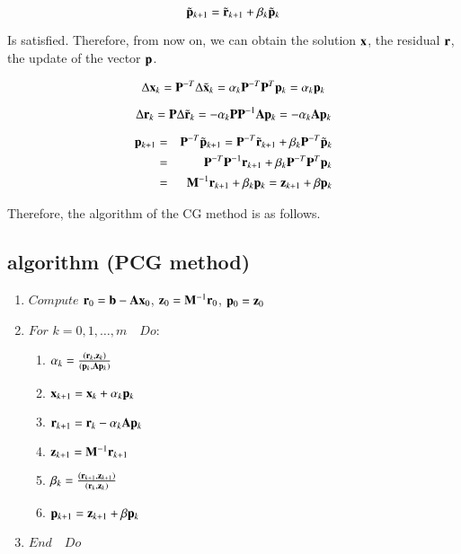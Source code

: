 \begin{equation}
\tilde{\mathbf{p}}_{k+1}=\tilde{\mathbf{r}}_{k+1}+\beta_k\tilde{\mathbf{p}}_k
\end{equation}

Is satisfied. Therefore, from now on, we can obtain the solution $\mathbf{x}$, the residual $\mathbf{r}$, the update of the vector $\mathbf{p}$.

\begin{equation}
\Delta\mathbf{x}_k=\mathbf{P}^{-T}\Delta\tilde{\mathbf{x}}_k=\alpha_k\mathbf{P}^{-T}\mathbf{P}^T\mathbf{p}_k=\alpha_k\mathbf{p}_k
\end{equation}


\begin{equation}
\Delta\mathbf{r}_k=\mathbf{P}\Delta\tilde{\mathbf{r}}_k=-\alpha_k\mathbf{P}\mathbf{P}^{-1}\mathbf{A}\mathbf{p}_k=-\alpha_k\mathbf{A}\mathbf{p}_k
\end{equation}


\begin{eqnarray}
\mathbf{p}_{k+1}
&=& \mathbf{P}^{-T}\tilde{\mathbf{p}}_{k+1}=\mathbf{P}^{-T}\tilde{\mathbf{r}}_{k+1}+\beta_k\mathbf{P}^{-T}\tilde{\mathbf{p}}_k\\
&=& \mathbf{P}^{-T}\mathbf{P}^{-1}\mathbf{r}_{k+1}+\beta_k\mathbf{P}^{-T}\mathbf{P}^T\mathbf{p}_k\\
&=& \mathbf{M}^{-1}\mathbf{r}_{k+1}+\beta_k\mathbf{p}_k=\mathbf{z}_{k+1}+\beta\mathbf{p}_k
\end{eqnarray}

Therefore, the algorithm of the CG method is as follows.

\subsection{algorithm (PCG method)}

\begin{enumerate}
\item $Compute$ $\mathbf{r}_0=\mathbf{b}-\mathbf{A}\mathbf{x}_0$, $\mathbf{z}_0=\mathbf{M}^{-1}\mathbf{r}_0$, $\mathbf{p}_0=\mathbf{z}_0$
\item $For$ $k=0,1,\ldots,m\quad$$Do:$
\begin{enumerate}
\item $\alpha_k=\frac{(\mathbf{r}_k,\mathbf{z}_k)}{(\mathbf{p}_k,\mathbf{A}\mathbf{p}_k)}$
\item $\mathbf{x}_{k+1}=\mathbf{x}_k+\alpha_k\mathbf{p}_k$
\item $\mathbf{r}_{k+1}=\mathbf{r}_k-\alpha_k\mathbf{A}\mathbf{p}_k$
\item $\mathbf{z}_{k+1}=\mathbf{M}^{-1}\mathbf{r}_{k+1}$
\item $\beta_k=\frac{(\mathbf{r}_{k+1},\mathbf{z}_{k+1})}{(\mathbf{r}_k,\mathbf{z}_k)}$
\item $\mathbf{p}_{k+1}=\mathbf{z}_{k+1}+\beta\mathbf{p}_k$
\end{enumerate}
\item $End \quad Do$
\end{enumerate}

